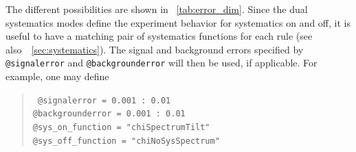 The different  possibilities are shown in
\Tab~\ref{tab:error_dim}. Since the dual systematics modes define the experiment
behavior for systematics on and off, it is useful to have a matching pair of 
systematics functions for each rule 
(see also~\Sec~\ref{sec:systematics}). The signal and background errors specified
by {\tt @signalerror} and  {\tt @backgrounderror} will then be used, if applicable.
For example, one may define 
\begin{quote}
{\tt
\tb @signalerror =       0.001  :       0.01\\
\tb @backgrounderror =   0.001 :       0.01 \\
\tb @sys\_on\_function = "chiSpectrumTilt"  \\
\tb @sys\_off\_function = "chiNoSysSpectrum"  
}
\end{quote}

